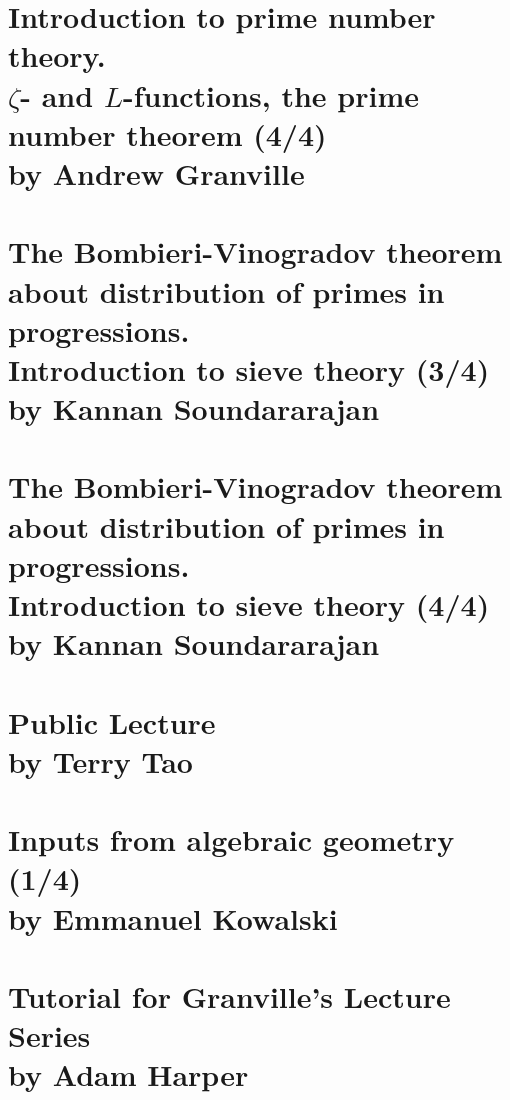 \documentclass[12pt,amsfont]{amsart}
\begin{document}
\section{Introduction to prime number theory.\\ $\zeta$- and $L$-functions,  the prime number theorem (4/4) \\by Andrew Granville}\label{6}

\newpage
\renewcommand{\thesubsection}{\arabic{section}.\arabic{subsection}}
\section{The Bombieri-Vinogradov theorem about distribution of primes in progressions. \\ Introduction to sieve theory (3/4)\\by Kannan Soundararajan}\label{7}

\newpage
\renewcommand{\thesubsection}{\arabic{section}.\arabic{subsection}}
\section{The Bombieri-Vinogradov theorem about distribution of primes in progressions. \\ Introduction to sieve theory (4/4)\\by Kannan Soundararajan}\label{8}

\newpage
\renewcommand{\thesubsection}{\arabic{section}.\arabic{subsection}}
\section{Public Lecture\\ by Terry Tao}\label{9}


\newpage
\renewcommand{\thesubsection}{\arabic{section}.\arabic{subsection}}
\section{Inputs from algebraic geometry (1/4)\\ by Emmanuel Kowalski}\label{10}

\newpage
\renewcommand{\thesubsection}{\arabic{section}.\arabic{subsection}}
\section{Tutorial for Granville's Lecture Series\\ by Adam Harper}\label{7}
\end{document}
